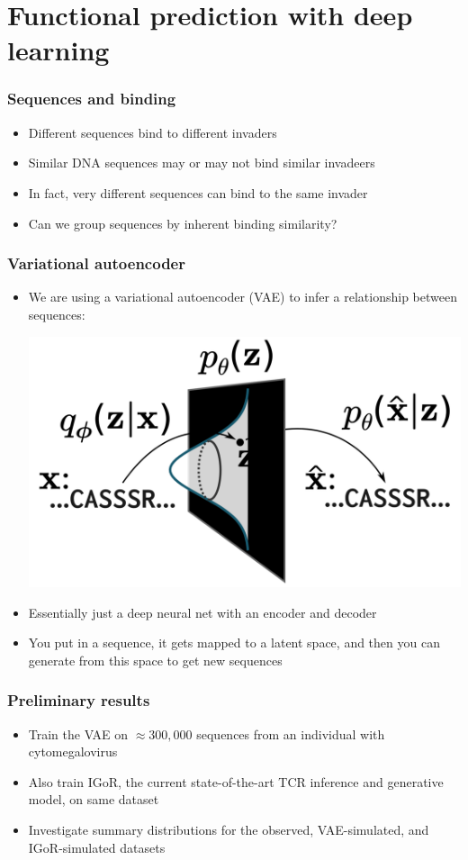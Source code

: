 \documentclass[mathserif,compress]{beamer}
\renewcommand\;{\,}
\begin{document}
\section{Functional prediction with deep learning}

\begin{frame}\frametitle{Sequences and binding}
\begin{itemize}
\item
Different sequences bind to different invaders
\bigskip
\item
Similar DNA sequences may or may not bind similar invadeers
\item
\bigskip
In fact, very different sequences can bind to the same invader
\bigskip
\item
Can we group sequences by inherent binding similarity?
\end{itemize}
\end{frame}

\begin{frame}\frametitle{Variational autoencoder}
\begin{itemize}
\item
We are using a variational autoencoder (VAE) to infer a relationship between sequences:
\begin{center}
\includegraphics[width=0.7\linewidth]{Images/VAE.png}
\end{center}
\item
Essentially just a deep neural net with an encoder and decoder
\bigskip
\item
You put in a sequence, it gets mapped to a latent space, and then you can generate from this space to get new sequences

\end{itemize}
\end{frame}

\begin{frame}\frametitle{Preliminary results}
\begin{itemize}
\item
Train the VAE on $\approx300,000$ sequences from an individual with cytomegalovirus
\bigskip
\item
Also train IGoR, the current state-of-the-art TCR inference and generative model, on same dataset
\bigskip
\item
Investigate summary distributions for the observed, VAE-simulated, and IGoR-simulated datasets 
\end{itemize}
\end{frame}
\end{document}
